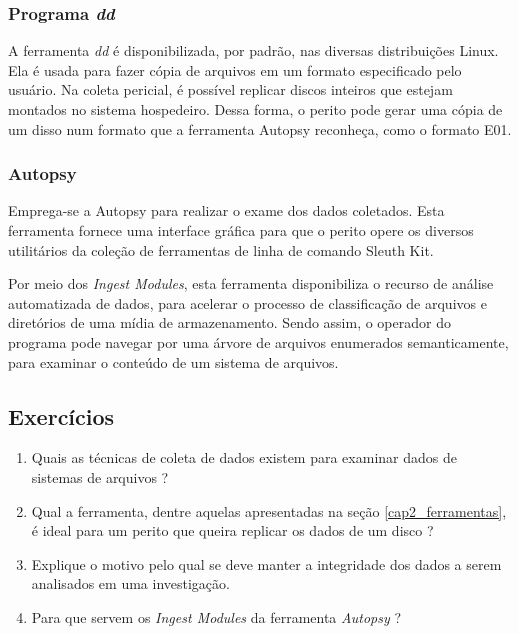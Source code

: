     \subsubsection{Programa \textit{dd}}
    
    \hspace{1cm}
    A ferramenta \textit{dd} é disponibilizada, por padrão, nas diversas distribuições Linux. Ela é usada para fazer cópia de arquivos em um formato especificado pelo usuário. Na coleta pericial, é possível replicar discos inteiros que estejam montados no sistema hospedeiro. Dessa forma, o perito pode gerar uma cópia de um disso num formato que a ferramenta Autopsy reconheça, como o formato E01.
    
    \subsubsection{Autopsy}

    \hspace{1cm}
    Emprega-se a Autopsy para realizar o exame dos dados coletados. Esta ferramenta fornece uma interface gráfica para que o perito opere os diversos utilitários da coleção de ferramentas de linha de comando Sleuth Kit.
    
    \vspace{4mm}
    
    \hspace{1cm}
    Por meio dos \textit{Ingest Modules}, esta ferramenta disponibiliza o recurso de análise automatizada de dados, para acelerar o processo de classificação de arquivos e diretórios de uma mídia de armazenamento. Sendo assim, o operador do programa pode navegar por uma árvore de arquivos enumerados semanticamente, para examinar o conteúdo de um sistema de arquivos.

    \subsection{Exercícios}
    
    \begin{example} \label{cap2_exercicios}
        \begin{enumerate}
            \item Quais as técnicas de coleta de dados existem para examinar dados de sistemas de arquivos ?
            \item Qual a ferramenta, dentre aquelas apresentadas na seção \ref{cap2_ferramentas}, é ideal para um perito que queira replicar os dados de um disco ?
            \item Explique o motivo pelo qual se deve manter a integridade dos dados a serem analisados em uma investigação.
            \item Para que servem os \textit{Ingest Modules} da ferramenta \textit{Autopsy} ?
        \end{enumerate}
    \end{example}
    
\newpage